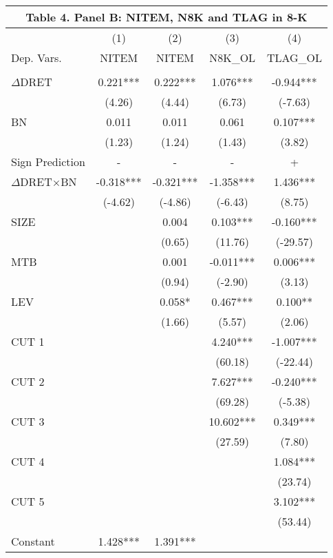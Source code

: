 \begin{table}[H]	\label{T4PB}%
	\centering
	\begin{tabular}{lcccc}
		\multicolumn{5}{c}{\textbf{Table 4. Panel B: NITEM, N8K and TLAG in 8-K}} \\
		\midrule
		\midrule
		& (1) & (2) & (3) & (4) \\
		Dep. Vars. & NITEM & NITEM & N8K\_OL & TLAG\_OL \\
		\midrule
		&   &   &   &  \\
		$\Delta$DRET & 0.221*** & 0.222*** & 1.076*** & -0.944*** \\
		& (4.26) & (4.44) & (6.73) & (-7.63) \\
		BN & 0.011 & 0.011 & 0.061 & 0.107*** \\
		& (1.23) & (1.24) & (1.43) & (3.82) \\
		\rowcolor[rgb]{ .933,  .925,  .882} Sign Prediction & - & - & - & + \\
		\rowcolor[rgb]{ .933,  .925,  .882} $\Delta$DRET$\times$BN & -0.318*** & -0.321*** & -1.358*** & 1.436*** \\
		\rowcolor[rgb]{ .933,  .925,  .882}   & (-4.62) & (-4.86) & (-6.43) & (8.75) \\
		SIZE &   & 0.004 & 0.103*** & -0.160*** \\
		&   & (0.65) & (11.76) & (-29.57) \\
		MTB &   & 0.001 & -0.011*** & 0.006*** \\
		&   & (0.94) & (-2.90) & (3.13) \\
		LEV &   & 0.058* & 0.467*** & 0.100** \\
		&   & (1.66) & (5.57) & (2.06) \\
		CUT 1 &   &   & 4.240*** & -1.007*** \\
		&   &   & (60.18) & (-22.44) \\
		CUT 2 &   &   & 7.627*** & -0.240*** \\
		&   &   & (69.28) & (-5.38) \\
		CUT 3 &   &   & 10.602*** & 0.349*** \\
		&   &   & (27.59) & (7.80) \\
		CUT 4 &   &   &   & 1.084*** \\
		&   &   &   & (23.74) \\
		CUT 5 &   &   &   & 3.102*** \\
		&   &   &   & (53.44) \\
		Constant & 1.428*** & 1.391*** &   &  \\

\end{tabular}
\end{table}
